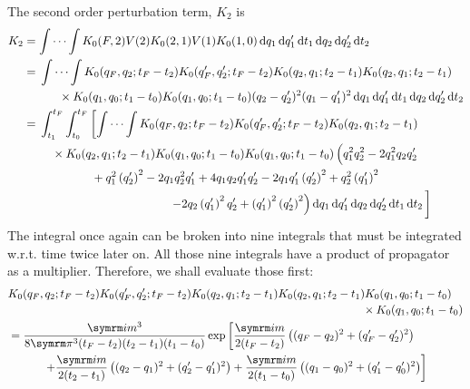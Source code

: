 The second order perturbation term, $K_2$ is
\begin{align}
    K_2 &= \idotsint K_0(F, 2)V(2)K_0(2, 1)V(1)K_0(1, 0)\dd{q_1}\dd{q_1'}\dd{t_1}\dd{q_2}\dd{q_2'}\dd{t_2} \\
    &= \begin{multlined}[t]
        \idotsint K_0(q_F, q_2; t_F - t_2)K_0(q_F', q_2'; t_F - t_2)K_0(q_2, q_1; t_2 - t_1)K_0(q_2, q_1; t_2 - t_1) \\ \times K_0(q_1, q_0; t_1 - t_0)K_0(q_1, q_0; t_1 - t_0)(q_2 - q_2')^2(q_1 - q_1')^2\dd{q_1}\dd{q_1'}\dd{t_1}\dd{q_2}\dd{q_2'}\dd{t_2}
    \end{multlined} \\
    &= \begin{multlined}[t]
        \int_{t_1}^{t_F}\int_{t_0}^{t_F}\left[\idotsint K_0(q_F, q_2; t_F - t_2)K_0(q_F', q_2'; t_F - t_2)K_0(q_2, q_1; t_2 - t_1)\right. \\ \times K_0(q_2, q_1; t_2 - t_1)K_0(q_1, q_0; t_1 - t_0)K_0(q_1, q_0; t_1 - t_0) \left(\vphantom{\left(q_{2}^{\prime}\right)^{2}} q_{1}^{2} q_{2}^{2} - 2 q_{1}^{2} q_{2} q_{2}^{\prime} \right.\\ + q_{1}^{2} \left(q_{2}^{\prime}\right)^{2} - 2 q_{1} q_{2}^{2} q_{1}^{\prime} + 4 q_{1} q_{2} q_{1}^{\prime} q_{2}^{\prime} - 2 q_{1} q_{1}^{\prime} \left(q_{2}^{\prime}\right)^{2} + q_{2}^{2} \left(q_{1}^{\prime}\right)^{2} \\ \left.\left. - 2 q_{2} \left(q_{1}^{\prime}\right)^{2} q_{2}^{\prime} + \left(q_{1}^{\prime}\right)^{2} \left(q_{2}^{\prime}\right)^{2} \right) \dd{q_1}\dd{q_1'}\dd{q_2}\dd{q_2'}\dd{t_1}\dd{t_2} \vphantom{\idotsint}\right]
    \end{multlined}
\end{align}
The integral once again can be broken into nine integrals that must be integrated w.r.t. time twice later on. All those nine integrals have a product of propagator as a multiplier. Therefore, we shall evaluate those first:
\begin{align}
    &\begin{multlined}[t]
        K_0(q_F, q_2; t_F - t_2)K_0(q_F', q_2'; t_F - t_2)K_0(q_2, q_1; t_2 - t_1)K_0(q_2, q_1; t_2 - t_1)K_0(q_1, q_0; t_1 - t_0) \\ \times K_0(q_1, q_0; t_1 - t_0)
    \end{multlined} \nonumber \\
    &= \begin{multlined}[t]
        \frac{\im m^3}{8\cpi^3(t_F - t_2)(t_2 - t_1)(t_1 - t_0)}\exp \left[\frac{\im m}{2(t_F - t_2)}\left((q_F - q_2)^2 + (q_F' - q_2')^2\right) \right. \\ \left. + \frac{\im m}{2(t_2 - t_1)}\left((q_2 - q_1)^2 + (q_2' - q_1')^2\right) + \frac{\im m}{2(t_1 - t_0)}\left((q_1 - q_0)^2 + (q_1' - q_0')^2\right)\right]
    \end{multlined}
\end{align}

